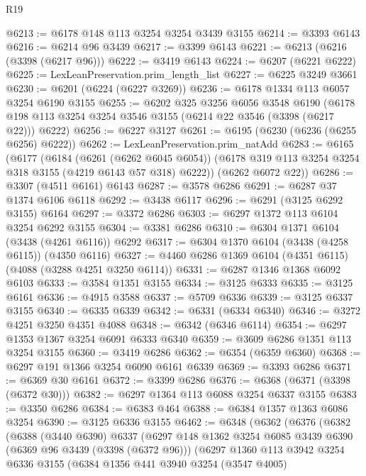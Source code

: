 \begin{lexlean}{R19}
\begin{coremodule}
@6213 := @6178 @148 @113 @3254 @3254 @3439 @3155
@6214 := @3393 @6143
@6216 := @6214 @96 @3439
@6217 := @3399 @6143
@6221 := @6213 (@6216 (@3398 (@6217 @96)))
@6222 := @3419 @6143
@6224 := @6207 (@6221 @6222)
@6225 := LexLeanPreservation.prim_length_list
@6227 := @6225 @3249 @3661
@6230 := @6201 (@6224 (@6227 @3269))
@6236 := @6178 @1334 @113 @6057 @3254 @6190 @3155
@6255 := @6202
    @325
    @3256
    @6056
    @3548
    @6190
    (@6178 @198 @113 @3254 @3254 @3546 @3155 (@6214 @22 @3546 (@3398 (@6217 @22))) @6222)
@6256 := @6227 @3127
@6261 := @6195 (@6230 (@6236 (@6255 @6256) @6222))
@6262 := LexLeanPreservation.prim_natAdd
@6283 := @6165
    (@6177
      (@6184
        (@6261 (@6262 @6045 @6054))
        (@6178 @319 @113 @3254 @3254 @318 @3155 (@4219 @6143 @57 @318) @6222))
      (@6262 @6072 @22))
@6286 := @3307 (@4511 @6161) @6143
@6287 := @3578 @6286
@6291 := @6287 @37 @1374 @6106 @6118
@6292 := @3438 @6117
@6296 := @6291 (@3125 @6292 @3155) @6164
@6297 := @3372 @6286
@6303 := @6297 @1372 @113 @6104 @3254 @6292 @3155
@6304 := @3381 @6286
@6310 := @6304 @1371 @6104 (@3438 (@4261 @6116)) @6292
@6317 := @6304 @1370 @6104 (@3438 (@4258 @6115)) (@4350 @6116)
@6327 := @4460 @6286 @1369 @6104 (@4351 @6115) (@4088 (@3288 @4251 @3250 @6114))
@6331 := @6287 @1346 @1368 @6092 @6103
@6333 := @3584 @1351 @3155
@6334 := @3125 @6333
@6335 := @3125 @6161
@6336 := @4915 @3588
@6337 := @5709 @6336
@6339 := @3125 @6337 @3155
@6340 := @6335 @6339
@6342 := @6331 (@6334 @6340)
@6346 := @3272 @4251 @3250 @4351 @4088
@6348 := @6342 (@6346 @6114)
@6354 := @6297 @1353 @1367 @3254 @6091 @6333 @6340
@6359 := @3609 @6286 @1351 @113 @3254 @3155
@6360 := @3419 @6286
@6362 := @6354 (@6359 @6360)
@6368 := @6297 @191 @1366 @3254 @6090 @6161 @6339
@6369 := @3393 @6286
@6371 := @6369 @30 @6161
@6372 := @3399 @6286
@6376 := @6368 (@6371 (@3398 (@6372 @30)))
@6382 := @6297 @1364 @113 @6088 @3254 @6337 @3155
@6383 := @3350 @6286
@6384 := @6383 @464
@6388 := @6384 @1357 @1363 @6086 @3254
@6390 := @3125 @6336 @3155
@6462 := @6348
    (@6362
      (@6376
        (@6382
          (@6388
            (@3440 @6390)
            @6337
            (@6297
              @148
              @1362
              @3254
              @6085
              @3439
              @6390
              (@6369 @96 @3439 (@3398 (@6372 @96)))
              (@6297
                @1360
                @113
                @3942
                @3254
                @6336
                @3155
                (@6384
                  @1356
                  @441
                  @3940
                  @3254
                  (@3547 @4005)

\end{coremodule}
\end{lexlean}
